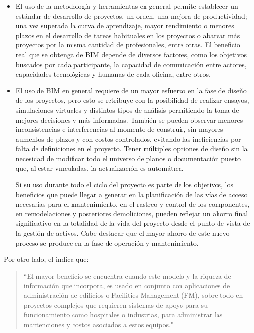 \begin{itemize}
    \item El uso de la metodología y herramientas en general permite establecer un estándar de desarrollo de proyectos, un orden, una mejora de productividad; una vez superada la curva de aprendizaje, mayor rendimiento o menores plazos en el desarrollo de tareas habituales en los proyectos o abarcar más proyectos por la misma cantidad de profesionales, entre otras. El beneficio real que se obtenga de BIM depende de diversos factores, como los objetivos buscados por cada participante, la capacidad de comunicación entre actores, capacidades tecnológicas y humanas de cada oficina, entre otros.
    \item {El uso de BIM en general requiere de un mayor esfuerzo en la fase de diseño de los proyectos, pero esto se retribuye con la posibilidad de realizar ensayos, simulaciones virtuales y distintos tipos de análisis permitiendo la toma de mejores decisiones y más informadas. También se pueden observar menores inconsistencias e interferencias al momento de construir, sin mayores aumentos de plazos y con costos controlados, evitando las ineficiencias por falta de definiciones en el proyecto. Tener múltiples opciones de diseño sin la necesidad de modificar todo el universo de planos o documentación puesto que, al estar vinculadas, la actualización es automática.
    
    Si su uso durante todo el ciclo del proyecto es parte de los objetivos, los beneficios que puede llegar a generar en la planificación de las vías de acceso necesarias para el mantenimiento, en el rastreo y control de los componentes, en remodelaciones y posteriores demoliciones, pueden reflejar un ahorro final significativo en la totalidad de la vida del proyecto desde el punto de vista de la gestión de activos. Cabe destacar que el mayor ahorro de este nuevo proceso se produce en la fase de operación y mantenimiento.} 
\end{itemize}

Por otro lado, el  indica que:

\begin{quote}
    ``El mayor beneficio se encuentra cuando este modelo y la riqueza de información que incorpora, es usado en conjunto con aplicaciones de administración de edificios o Facilities Management (FM), sobre todo en proyectos complejos que requieren sistemas de apoyo para su funcionamiento como hospitales o industrias, para administrar las mantenciones y costos asociados a estos equipos."    
\end{quote}

